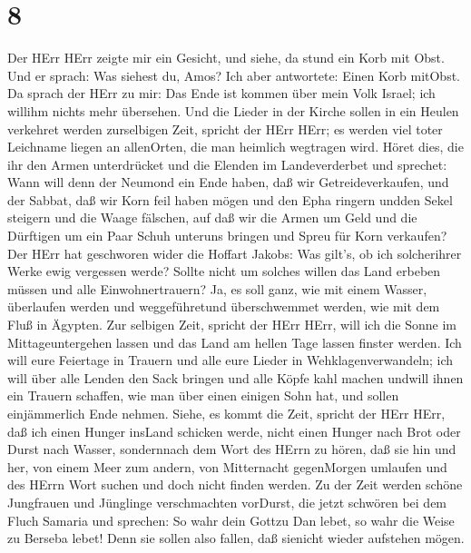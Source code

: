 \hypertarget{section-7}{%
\section{8}\label{section-7}}

 Der HErr HErr zeigte mir ein Gesicht, und siehe, da stund
ein Korb mit Obst.  Und er sprach: Was siehest du, Amos? Ich
aber antwortete: Einen Korb mitObst. Da sprach der HErr zu mir: Das Ende
ist kommen über mein Volk Israel; ich willihm nichts mehr übersehen.
 Und die Lieder in der Kirche sollen in ein Heulen verkehret
werden zurselbigen Zeit, spricht der HErr HErr; es werden viel toter
Leichname liegen an allenOrten, die man heimlich wegtragen wird.
 Höret dies, die ihr den Armen unterdrücket und die Elenden
im Landeverderbet  und sprechet: Wann will denn der Neumond
ein Ende haben, daß wir Getreideverkaufen, und der Sabbat, daß wir Korn
feil haben mögen und den Epha ringern undden Sekel steigern und die
Waage fälschen,  auf daß wir die Armen um Geld und die
Dürftigen um ein Paar Schuh unteruns bringen und Spreu für Korn
verkaufen?  Der HErr hat geschworen wider die Hoffart
Jakobs: Was gilt's, ob ich solcherihrer Werke ewig vergessen werde?
 Sollte nicht um solches willen das Land erbeben müssen und
alle Einwohnertrauern? Ja, es soll ganz, wie mit einem Wasser,
überlaufen werden und weggeführetund überschwemmet werden, wie mit dem
Fluß in Ägypten.  Zur selbigen Zeit, spricht der HErr HErr,
will ich die Sonne im Mittageuntergehen lassen und das Land am hellen
Tage lassen finster werden.  Ich will eure Feiertage in
Trauern und alle eure Lieder in Wehklagenverwandeln; ich will über alle
Lenden den Sack bringen und alle Köpfe kahl machen undwill ihnen ein
Trauern schaffen, wie man über einen einigen Sohn hat, und sollen
einjämmerlich Ende nehmen.  Siehe, es kommt die Zeit,
spricht der HErr HErr, daß ich einen Hunger insLand schicken werde,
nicht einen Hunger nach Brot oder Durst nach Wasser, sondernnach dem
Wort des HErrn zu hören,  daß sie hin und her, von einem
Meer zum andern, von Mitternacht gegenMorgen umlaufen und des HErrn Wort
suchen und doch nicht finden werden.  Zu der Zeit werden
schöne Jungfrauen und Jünglinge verschmachten vorDurst, 
die jetzt schwören bei dem Fluch Samaria und sprechen: So wahr dein
Gottzu Dan lebet, so wahr die Weise zu Berseba lebet! Denn sie sollen
also fallen, daß sienicht wieder aufstehen mögen.

